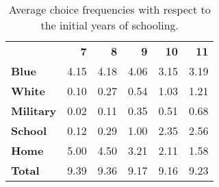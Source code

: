 \begin{ThreePartTable}

	\begin{longtable}[c]{@{}lrrrrr@{}}
		\caption{Average choice frequencies with respect to the initial years of schooling.}
		\label{tab:InitialSchoolingActivity}

		\setlength\extrarowheight{2.5pt}
		
		\\
		\toprule
		
   &	\textbf{7}	&	\textbf{8}	&	\textbf{9}	&	\textbf{10}	&	\textbf{11}	\\ \midrule
		\endfirsthead
\textbf{Blue}	&	4.15	&	4.18	&	4.06	&	3.15	&	3.19	\\
\textbf{White}	&	0.10	&	0.27	&	0.54	&	1.03	&	1.21	\\
\textbf{Military}&	0.02	&	0.11	&	0.35	&	0.51	&	0.68	\\
\textbf{School}	&	0.12	&	0.29	&	1.00	&	2.35	&	2.56	\\
\textbf{Home}	&	5.00	&	4.50	&	3.21	&	2.11	&	1.58	\\
\textbf{Total}	&	9.39	&	9.36	&	9.17	&	9.16	&	9.23	\\



  \bottomrule
	\end{longtable}
\end{ThreePartTable}
